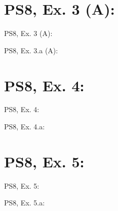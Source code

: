 \section{PS8, Ex. 3 (A): }

\begin{frame}{PS8, Ex. 3 (A): }
  \begin{multicols}{2}
    \vfill\null\columnbreak
    \vfill
  \end{multicols}
\end{frame}

\begin{frame}{PS8, Ex. 3.a (A): }
  \begin{multicols}{2}
    \vfill\null\columnbreak
    \vfill
  \end{multicols}
\end{frame}



\section{PS8, Ex. 4: }

\begin{frame}{PS8, Ex. 4: }
  \begin{multicols}{2}
    \vfill\null\columnbreak
    \vfill
  \end{multicols}
\end{frame}

\begin{frame}{PS8, Ex. 4.a: }
  \begin{multicols}{2}
    \vfill\null \columnbreak
    \vfill\null
  \end{multicols}
\end{frame}



\section{PS8, Ex. 5: }

\begin{frame}{PS8, Ex. 5: }
  \begin{multicols}{2}
    \vfill\null\columnbreak
    \vfill
  \end{multicols}
\end{frame}

\begin{frame}{PS8, Ex. 5.a: }
  \begin{multicols}{2}
    \vfill\null\columnbreak
    \vfill
  \end{multicols}
\end{frame}



